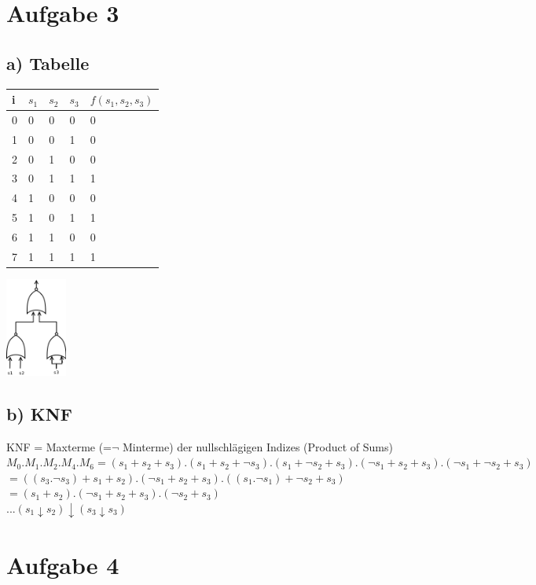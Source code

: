 \documentclass[10pt,a4paper]{scrartcl}
\begin{document}
\section{Aufgabe 3}
\subsection{a) Tabelle}
\begin{tabular}{|l||l|l|l||l|}\hline
i & $s_1$ & $s_2$ & $s_3$ & $f(s_1,s_2,s_3)$ \\\hline\hline
0 & 0 & 0 & 0 & 0 \\\hline
1 & 0 & 0 & 1 & 0 \\\hline
2 & 0 & 1 & 0 & 0 \\\hline
3 & 0 & 1 & 1 & 1 \\\hline
4 & 1 & 0 & 0 & 0 \\\hline
5 & 1 & 0 & 1 & 1 \\\hline
6 & 1 & 1 & 0 & 0 \\\hline
7 & 1 & 1 & 1 & 1 \\\hline
\end{tabular}
\hspace{2cm}
\includegraphics[width=2cm]{2-3-b.png}

\subsection{b) KNF}
KNF = Maxterme (=$\neg$ Minterme) der nullschlägigen Indizes (Product of Sums)\\
$M_0 . M_1 . M_2 . M_4 . M_6 = (s_1+s_2+s_3) . (s_1+s_2+\neg s_3) . (s_1+\neg s_2+s_3) . (\neg s_1+s_2+s_3) . (\neg s_1+\neg s_2+s_3)$\\
$= ((s_3.\neg s_3)+s_1+s_2) . (\neg s_1+s_2+s_3) . ((s_1.\neg s_1)+\neg s_2+s_3) $\\
$= (s_1+s_2) . (\neg s_1+s_2+s_3) . (\neg s_2+s_3)$\\
...$(s_1 \downarrow s_2) \downarrow (s_3 \downarrow s_3)$


\section{Aufgabe 4}
\end{document}
